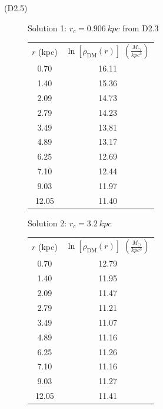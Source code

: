 \begin{description}

\item[(D2.5)] Solution 1: $r_c = 0.906\ kpc$ from D2.3

  \begin{center}
  \begin{tabular}{cc}
  $r$ (kpc) & $\ln\left[\rho_{\mathrm{DM}}(r)\right]$
    $\left(\frac{M_\odot}{kpc^3}\right)$\\
  0.70 & 16.11\\
  1.40 & 15.36\\
  2.09 & 14.73\\
  2.79 & 14.23\\
  3.49 & 13.81\\
  4.89 & 13.17\\
  6.25 & 12.69\\
  7.10 & 12.44\\
  9.03 & 11.97\\
  12.05 & 11.40
  \end{tabular}
  \end{center}

  Solution 2: $r_c = 3.2\ kpc$

  \begin{center}
  \begin{tabular}{cc}
  $r$ (kpc) & $\ln\left[\rho_{\mathrm{DM}}(r)\right]$
    $\left(\frac{M_\odot}{kpc^3}\right)$\\
  0.70 & 12.79\\
  1.40 & 11.95\\
  2.09 & 11.47\\
  2.79 & 11.21\\
  3.49 & 11.07\\
  4.89 & 11.16\\
  6.25 & 11.26\\
  7.10 & 11.16\\
  9.03 & 11.27\\
  12.05 & 11.41
  \end{tabular}
  \end{center}
\end{description}
